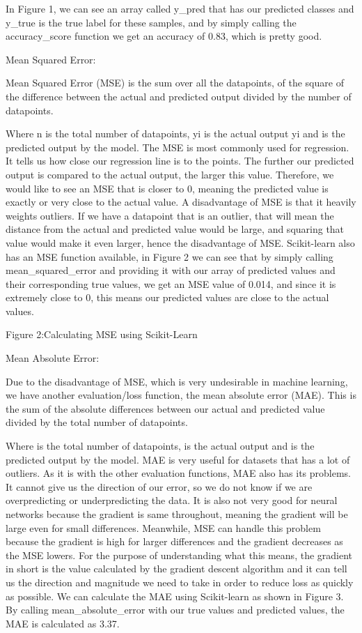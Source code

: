 \documentclass[a4paper,12pt]{report}
\begin{document}
In Figure 1, we can see an array called y\_pred that has our predicted classes and y\_true is the true label for these samples, and by simply calling the accuracy\_score function we get an accuracy of 0.83, which is pretty good.
 
 
Mean Squared Error:

Mean Squared Error (MSE) is the sum over all the datapoints, of the square of the difference between the actual and predicted output divided by the number of datapoints.

Where n is the total number of datapoints, yi is the actual output yi and  is the predicted output by the model. The MSE is most commonly used for regression. It tells us how close our regression line is to the points. The further our predicted output is compared to the actual output, the larger this value. Therefore, we would like to see an MSE that is closer to 0, meaning the predicted value is exactly or very close to the actual value. A disadvantage of MSE is that it heavily weights outliers. If we have a datapoint that is an outlier, that will mean the distance from the actual and predicted value would be large, and squaring that value would make it even larger, hence the disadvantage of MSE. Scikit-learn also has an MSE function available, in Figure 2 we can see that by simply calling mean\_squared\_error and providing it with our array of predicted values and their corresponding true values, we get an MSE value of 0.014, and since it is extremely close to 0, this means our predicted values are close to the actual values.

Figure 2:Calculating MSE using Scikit-Learn
 
Mean Absolute Error:

Due to the disadvantage of MSE, which is very undesirable in machine learning, we have another evaluation/loss function, the mean absolute error (MAE). This is the sum of the absolute differences between our actual and predicted value divided by the total number of datapoints.



Where  is the total number of datapoints,  is the actual output and  is the predicted output by the model. MAE is very useful for datasets that has a lot of outliers. As it is with the other evaluation functions, MAE also has its problems. It cannot give us the direction of our error, so we do not know if we are overpredicting or underpredicting the data. It is also not very good for neural networks because the gradient is same throughout, meaning the gradient will be large even for small differences. Meanwhile, MSE can handle this problem because the gradient is high for larger differences and the gradient decreases as the MSE lowers. For the purpose of understanding what this means, the gradient in short is the value calculated by the gradient descent algorithm and it can tell us the direction and magnitude we need to take in order to reduce loss as quickly as possible. We can calculate the MAE using Scikit-learn as shown in Figure 3. By calling mean\_absolute\_error with our true values and predicted values, the MAE is calculated as 3.37.
\end{document}

